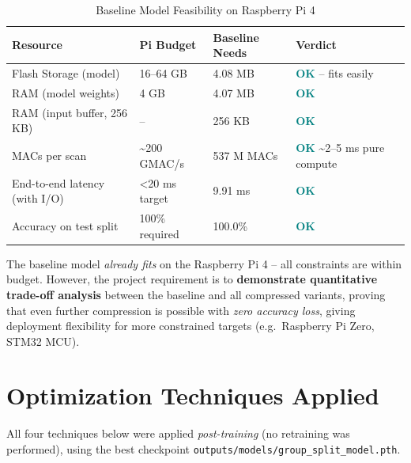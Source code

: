 \documentclass[12pt,a4paper]{article}
\begin{document}
\begin{table}[h!]
\centering
\caption{Baseline Model Feasibility on Raspberry Pi 4}
\renewcommand{\arraystretch}{1.3}
\begin{tabular}{L{4.5cm} C{2.5cm} C{2.5cm} L{4.5cm}}
\toprule
{}
\color{white}\textbf{Resource} &
\color{white}\textbf{Pi Budget} &
\color{white}\textbf{Baseline Needs} &
\color{white}\textbf{Verdict} \\
\midrule
Flash Storage (model) & 16--64 GB & 4.08 MB & \textcolor{Teal}{\textbf{OK}} -- fits easily \\
RAM (model weights) & 4 GB & 4.07 MB & \textcolor{Teal}{\textbf{OK}} \\
RAM (input buffer, 256 KB) & -- & 256 KB & \textcolor{Teal}{\textbf{OK}} \\
MACs per scan & \textasciitilde 200 GMAC/s & 537 M MACs & \textcolor{Teal}{\textbf{OK}} \textasciitilde 2--5 ms pure compute \\
End-to-end latency (with I/O) & \textless 20 ms target & 9.91 ms & \textcolor{Teal}{\textbf{OK}} \\
Accuracy on test split & 100\% required & 100.0\% & \textcolor{Teal}{\textbf{OK}} \\
\bottomrule
\end{tabular}
\end{table}

\noindent
The baseline model \textit{already fits} on the Raspberry Pi 4 -- all
constraints are within budget.  However, the project requirement is to
\textbf{demonstrate quantitative trade-off analysis} between the baseline and
all compressed variants, proving that even further compression is possible
with \textit{zero accuracy loss}, giving deployment flexibility for more
constrained targets (e.g.\ Raspberry Pi Zero, STM32 MCU).

\section{Optimization Techniques Applied}

All four techniques below were applied \textit{post-training} (no retraining
was performed), using the best checkpoint
\texttt{outputs/models/group\_split\_model.pth}.
\end{document}
